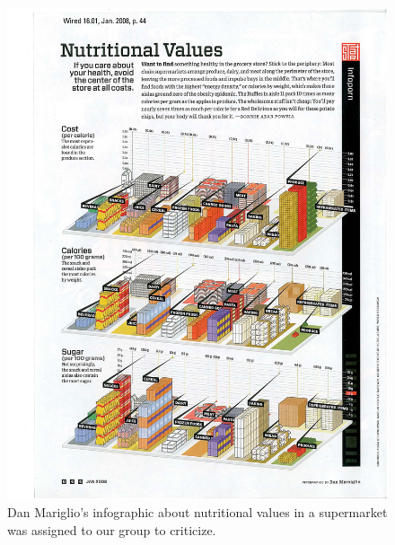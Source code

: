 \documentclass[a4paper, 11pt]{scrartcl}
\begin{document}
\begin{figure}[h]
  \centering
	\includegraphics[scale=0.20]{assignmentGraphic.jpg}
  \caption{Dan Mariglio's infographic about nutritional values in a supermarket
	was assigned to our group to criticize.}
	\label{assignmentGraphic}
\end{figure}
\end{document}

